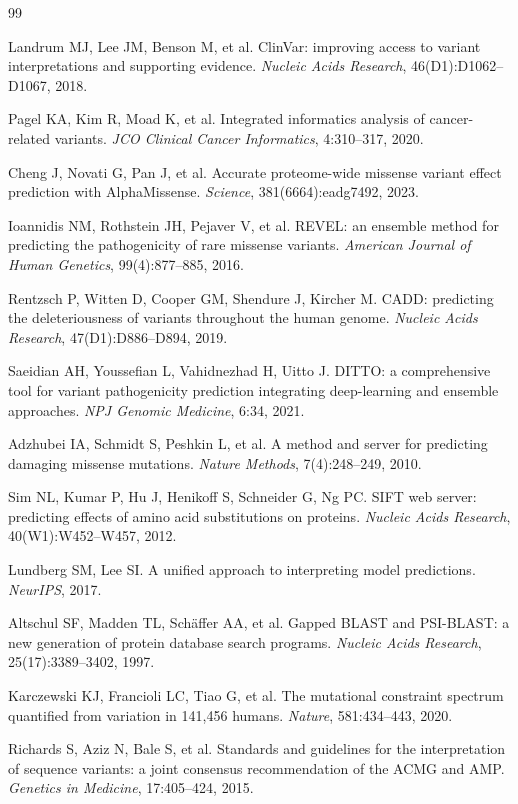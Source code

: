 \documentclass[11pt,a4paper]{article}
\begin{document}
\begin{thebibliography}{99}

 Landrum MJ, Lee JM, Benson M, et al.
ClinVar: improving access to variant interpretations and supporting evidence.
\textit{Nucleic Acids Research}, 46(D1):D1062--D1067, 2018.

 Pagel KA, Kim R, Moad K, et al.
Integrated informatics analysis of cancer-related variants.
\textit{JCO Clinical Cancer Informatics}, 4:310--317, 2020.

 Cheng J, Novati G, Pan J, et al.
Accurate proteome-wide missense variant effect prediction with AlphaMissense.
\textit{Science}, 381(6664):eadg7492, 2023.

 Ioannidis NM, Rothstein JH, Pejaver V, et al.
REVEL: an ensemble method for predicting the pathogenicity of rare missense variants.
\textit{American Journal of Human Genetics}, 99(4):877--885, 2016.

 Rentzsch P, Witten D, Cooper GM, Shendure J, Kircher M.
CADD: predicting the deleteriousness of variants throughout the human genome.
\textit{Nucleic Acids Research}, 47(D1):D886--D894, 2019.

 Saeidian AH, Youssefian L, Vahidnezhad H, Uitto J.
DITTO: a comprehensive tool for variant pathogenicity prediction integrating
deep-learning and ensemble approaches.
\textit{NPJ Genomic Medicine}, 6:34, 2021.

 Adzhubei IA, Schmidt S, Peshkin L, et al.
A method and server for predicting damaging missense mutations.
\textit{Nature Methods}, 7(4):248--249, 2010.

 Sim NL, Kumar P, Hu J, Henikoff S, Schneider G, Ng PC.
SIFT web server: predicting effects of amino acid substitutions on proteins.
\textit{Nucleic Acids Research}, 40(W1):W452--W457, 2012.

 Lundberg SM, Lee SI.
A unified approach to interpreting model predictions.
\textit{NeurIPS}, 2017.

 Altschul SF, Madden TL, Sch\"affer AA, et al.
Gapped BLAST and PSI-BLAST: a new generation of protein database search programs.
\textit{Nucleic Acids Research}, 25(17):3389--3402, 1997.

 Karczewski KJ, Francioli LC, Tiao G, et al.
The mutational constraint spectrum quantified from variation in 141{,}456 humans.
\textit{Nature}, 581:434--443, 2020.

 Richards S, Aziz N, Bale S, et al.
Standards and guidelines for the interpretation of sequence variants: a joint
consensus recommendation of the ACMG and AMP.
\textit{Genetics in Medicine}, 17:405--424, 2015.


\end{thebibliography}
\end{document}

